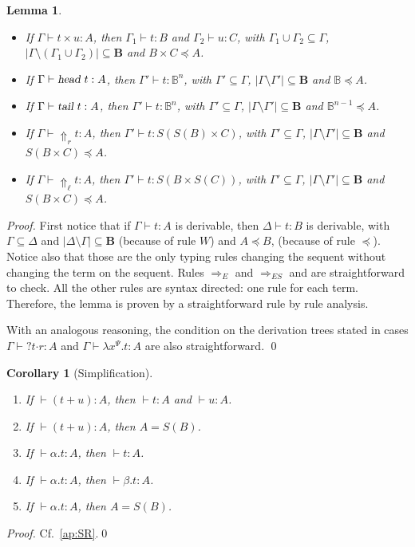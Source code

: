 \documentclass[preprint]{elsarticle}
\newtheorem{lemma}[theorem]{Lemma}
\newtheorem{corollary}[theorem]{Corollary}
\newcommand\B{\ensuremath{\mathbb B}}
\newcommand\ite[3]{{#1}?{#2}\mathord{\cdot}{#3}}
\newcommand\pair[2]{({#1}+{#2})}
\newcommand\bqtypes{\ensuremath{\mathbf B}}
\newcommand\head{\text{\sl head}}
\newcommand\tail{\text{\sl tail}}
\begin{document}
\begin{lemma}
\begin{itemize}
\begin{itemize}
      with $S(B)\preceq A$.
    \end{itemize}
    In both cases, $\Gamma_1\cup\Gamma_2\subseteq\Gamma$ and
    $|\Gamma|\setminus|\Gamma_1\cup\Gamma_2|\subseteq\bqtypes$.
  \item If $\Gamma\vdash t\times u:A$, then $\Gamma_1\vdash t:B$ and
    $\Gamma_2\vdash u:C$, with $\Gamma_1\cup\Gamma_2\subseteq\Gamma$,
    $|\Gamma\setminus(\Gamma_1\cup\Gamma_2)|\subseteq\bqtypes$ and $B\times
    C\preceq A$.
  \item If $\Gamma\vdash \head~t:A$, then $\Gamma'\vdash t:\B^n$, with
    $\Gamma'\subseteq\Gamma$, $|\Gamma\setminus\Gamma'|\subseteq\bqtypes$ and
    $\B\preceq A$.
  \item If $\Gamma\vdash \tail~t:A$, then $\Gamma'\vdash t:\B^n$, with
    $\Gamma'\subseteq\Gamma$, $|\Gamma\setminus\Gamma'|\subseteq\bqtypes$ and
    $\B^{n-1}\preceq A$.
  \item If $\Gamma\vdash\Uparrow_r t:A$, then $\Gamma'\vdash t:S(S(B)\times C)$, with
    $\Gamma'\subseteq\Gamma$, $|\Gamma\setminus\Gamma'|\subseteq\bqtypes$ and
    $S(B\times C)\preceq A$.
  \item If $\Gamma\vdash\Uparrow_\ell t:A$, then $\Gamma'\vdash t:S(B\times S(C))$, with
    $\Gamma'\subseteq\Gamma$, $|\Gamma\setminus\Gamma'|\subseteq\bqtypes$ and
    $S(B\times C)\preceq A$.
  \end{itemize}
\end{lemma}
\begin{proof}
  First notice that if $\Gamma\vdash t:A$ is derivable, then $\Delta\vdash t:B$
  is derivable, with $\Gamma\subseteq\Delta$ and
  $|\Delta\setminus\Gamma|\subseteq\bqtypes$ (because of rule $W$) and $A\preceq
  B$, (because of rule $\preceq$). Notice also that those are the only typing
  rules changing the sequent without changing the term on the sequent. Rules
  $\Rightarrow_E$ and $\Rightarrow_{ES}$ and are straightforward to check. All
  the other rules are syntax directed: one
  rule for each term. Therefore, the lemma is proven by a straightforward rule
  by rule analysis.

  With an analogous reasoning, the condition on the derivation trees stated in cases
  $\Gamma\vdash\ite{}tr:A$ and $\Gamma\vdash\lambda x^\Psi.t:A$ are also straightforward.
  \qed
\end{proof}

\begin{corollary}[Simplification]\label{cor:simplification}~
  \begin{enumerate}
  \item If $\vdash\pair tu:A$, then $\vdash t:A$ and $\vdash u:A$.
  \item If $\vdash\pair tu:A$, then $A=S(B)$.
  \item If $\vdash \alpha.t:A$, then $\vdash t:A$.
  \item If $\vdash\alpha.t:A$, then $\vdash\beta.t:A$.
  \item If $\vdash \alpha.t:A$, then $A=S(B)$.
  \end{enumerate}
\end{corollary}
\begin{proof}
  Cf.~\ref{ap:SR}.\qed
\end{proof}
\end{document}
